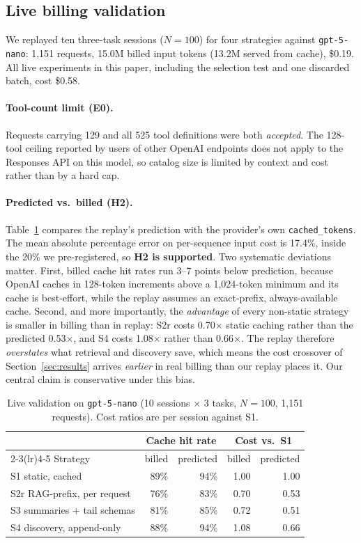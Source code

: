 \documentclass[11pt]{article}
\begin{document}
\subsection{Live billing validation}
\label{sec:live}
We replayed ten three-task sessions ($N{=}100$) for four strategies against \texttt{gpt-5-nano}: 1,151 requests, 15.0M billed input tokens (13.2M served from cache), \$0.19. All live experiments in this paper, including the selection test and one discarded batch, cost \$0.58.

\paragraph{Tool-count limit (E0).} Requests carrying 129 and all 525 tool definitions were both \emph{accepted}. The 128-tool ceiling reported by users of other OpenAI endpoints does not apply to the Responses API on this model, so catalog size is limited by context and cost rather than by a hard cap.

\paragraph{Predicted vs.\ billed (H2).} Table~\ref{tab:live} compares the replay's prediction with the provider's own \texttt{cached\_tokens}. The mean absolute percentage error on per-sequence input cost is 17.4\%, inside the 20\% we pre-registered, so \textbf{H2 is supported}. Two systematic deviations matter. First, billed cache hit rates run 3--7 points below prediction, because OpenAI caches in 128-token increments above a 1,024-token minimum and its cache is best-effort, while the replay assumes an exact-prefix, always-available cache. Second, and more importantly, the \emph{advantage} of every non-static strategy is smaller in billing than in replay: S2r costs 0.70$\times$ static caching rather than the predicted 0.53$\times$, and S4 costs 1.08$\times$ rather than 0.66$\times$. The replay therefore \emph{overstates} what retrieval and discovery save, which means the cost crossover of Section~\ref{sec:results} arrives \emph{earlier} in real billing than our replay places it. Our central claim is conservative under this bias.

\begin{table}[t]
\centering\small
\caption{Live validation on \texttt{gpt-5-nano} (10 sessions $\times$ 3 tasks, $N{=}100$, 1,151 requests). Cost ratios are per session against S1.}
\label{tab:live}
\begin{tabular}{@{}lrrrr@{}}
\toprule
 & \multicolumn{2}{c}{Cache hit rate} & \multicolumn{2}{c}{Cost vs.\ S1} \\
\cmidrule(lr){2-3}\cmidrule(lr){4-5}
Strategy & billed & predicted & billed & predicted \\
\midrule
S1 static, cached & 89\% & 94\% & 1.00 & 1.00 \\
S2r RAG-prefix, per request & 76\% & 83\% & 0.70 & 0.53 \\
S3 summaries + tail schemas & 81\% & 85\% & 0.72 & 0.51 \\
S4 discovery, append-only & 88\% & 94\% & 1.08 & 0.66 \\
\bottomrule
\end{tabular}
\end{table}
\end{document}
